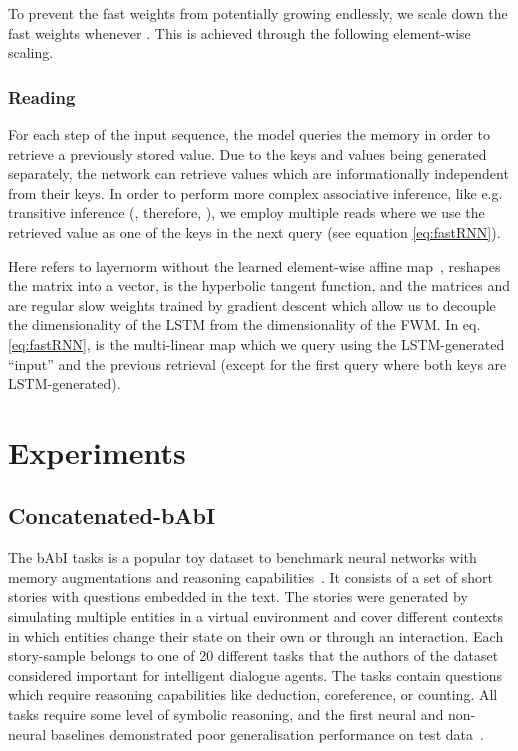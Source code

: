 \documentclass{article} \usepackage{iclr2021_conference,times}
\begin{document}
To prevent the fast weights from potentially growing endlessly, we scale down the fast weights whenever . This is achieved through the following element-wise scaling.


\subsubsection{Reading}
For each step of the input sequence, the model queries the memory in order to retrieve a previously stored value. 
Due to the keys and values being generated separately, the network can retrieve values which are informationally independent from their keys. In order to perform more complex associative inference, like e.g. transitive inference (, therefore, ), we employ multiple reads where we use the retrieved value as one of the keys in the next query (see equation \ref{eq:fastRNN}). 



Here  refers to layernorm without the learned element-wise affine map~\citep{ba2016layer},  reshapes the matrix into a vector,  is the hyperbolic tangent function, and the matrices  and  are regular slow weights trained by gradient descent which allow us to decouple the dimensionality of the LSTM from the dimensionality of the FWM.
In eq. \ref{eq:fastRNN},  is the multi-linear map which we query using the LSTM-generated ``input''  and the previous retrieval  (except for the first query where both keys are LSTM-generated). 



\section{Experiments}
\label{sec:experiments}

\subsection{Concatenated-bAbI}
\label{subsec:catbAbI}
The bAbI tasks is a popular toy dataset to benchmark neural networks with memory augmentations and reasoning capabilities~\citep{babi_tasks_weston}. 
It consists of a set of short stories with questions embedded in the text. 
The stories were generated by simulating multiple entities in a virtual environment and cover different contexts in which entities change their state on their own or through an interaction.
Each story-sample belongs to one of 20 different tasks that the authors of the dataset considered important for intelligent dialogue agents. 
The tasks contain questions which require reasoning capabilities like deduction, coreference, or counting.
All tasks require some level of symbolic reasoning, and the first neural and non-neural baselines demonstrated poor generalisation performance on test data~\citep{babi_tasks_weston}.
\end{document}
